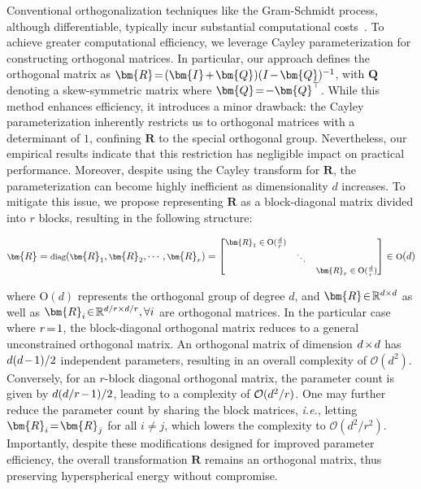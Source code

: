 Conventional orthogonalization techniques like the Gram-Schmidt process, although differentiable, typically incur substantial computational costs~\cite{liu2021orthogonal}. To achieve greater computational efficiency, we leverage Cayley parameterization for constructing orthogonal matrices. In particular, our approach defines the orthogonal matrix as $\thickmuskip=2mu \medmuskip=2mu \bm{R}=(\bm{I}+\bm{Q})(I-\bm{Q})^{-1}$, with $\bm{Q}$ denoting a skew-symmetric matrix where $\thickmuskip=2mu \medmuskip=2mu \bm{Q}=-\bm{Q}^\top$. While this method enhances efficiency, it introduces a minor drawback: the Cayley parameterization inherently restricts us to orthogonal matrices with a determinant of $1$, confining $\bm{R}$ to the special orthogonal group. Nevertheless, our empirical results indicate that this restriction has negligible impact on practical performance. Moreover, despite using the Cayley transform for $\bm{R}$, the parameterization can become highly inefficient as dimensionality $d$ increases. To mitigate this issue, we propose representing $\bm{R}$ as a block-diagonal matrix divided into $r$ blocks, resulting in the following structure:

\begin{equation}
    \footnotesize
    \bm{R}=\text{diag}(\bm{R}_1,\bm{R}_2,\cdots,\bm{R}_r)=\begin{bmatrix}
    \bm{R}_1\in \text{O}(\frac{d}{r}) &  &\\
    &\ddots & \\
    & & \bm{R}_r\in \text{O}(\frac{d}{r})
    \end{bmatrix}\in \text{O}(d)
\end{equation}

where $\text{O}(d)$ represents the orthogonal group of degree $d$, and $\thickmuskip=2mu \medmuskip=2mu \bm{R}\in\mathbb{R}^{d\times d}$ as well as $\thickmuskip=2mu \medmuskip=2mu \bm{R}_i\in\mathbb{R}^{d/r\times d/r},\forall i$ are orthogonal matrices. In the particular case where $\thickmuskip=2mu \medmuskip=2mu r=1$, the block-diagonal orthogonal matrix reduces to a general unconstrained orthogonal matrix. An orthogonal matrix of dimension $\thickmuskip=2mu \medmuskip=2mu d\times d$ has $\thickmuskip=2mu \medmuskip=2mu d(d-1)/2$ independent parameters, resulting in an overall complexity of $\mathcal{O}(d^2)$. Conversely, for an $r$-block diagonal orthogonal matrix, the parameter count is given by $\thickmuskip=2mu \medmuskip=2mu d(d/r-1)/2$, leading to a complexity of $\thickmuskip=2mu \medmuskip=2mu \mathcal{O}(d^2/r)$. One may further reduce the parameter count by sharing the block matrices, \emph{i.e.}, letting $\thickmuskip=2mu \medmuskip=2mu\bm{R}_i=\bm{R}_j$ for all $i\neq j$, which lowers the complexity to $\mathcal{O}(d^2/r^2)$. Importantly, despite these modifications designed for improved parameter efficiency, the overall transformation $\bm{R}$ remains an orthogonal matrix, thus preserving hyperspherical energy without compromise.

